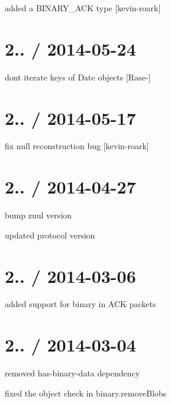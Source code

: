 \begin{DoxyItemize}
\item added a B\+I\+N\+A\+R\+Y\+\_\+\+A\+CK type \mbox{[}kevin-\/roark\mbox{]}
\end{DoxyItemize}

\section*{2.. / 2014-\/05-\/24 }


\begin{DoxyItemize}
\item don\textquotesingle{}t iterate keys of {\ttfamily Date} objects \mbox{[}Rase-\/\mbox{]}
\end{DoxyItemize}

\section*{2.. / 2014-\/05-\/17 }


\begin{DoxyItemize}
\item fix null reconstruction bug \mbox{[}kevin-\/roark\mbox{]}
\end{DoxyItemize}

\section*{2.. / 2014-\/04-\/27 }


\begin{DoxyItemize}
\item bump zuul version
\item updated protocol version
\end{DoxyItemize}

\section*{2.. / 2014-\/03-\/06 }


\begin{DoxyItemize}
\item added support for binary in A\+CK packets
\end{DoxyItemize}

\section*{2.. / 2014-\/03-\/04 }


\begin{DoxyItemize}
\item removed has-\/binary-\/data dependency
\item fixed the object check in binary.\+remove\+Blobs
\end{DoxyItemize}

